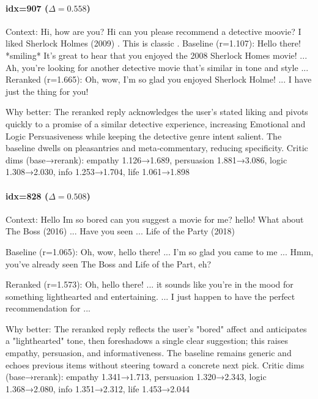 \documentclass[12pt]{article}
\begin{document}
  \paragraph{idx=907 ($\Delta=0.558$)}
  \begin{center}
  \begin{qexample}
  Context: Hi, how are you? Hi can you please recommend a detective moovie? I liked Sherlock Holmes (2009) . This is classic .
  Baseline (r=1.107): Hello there! *smiling* It's great to hear that you enjoyed the 2008 Sherlock Homes movie! ... Ah, you're looking for another detective movie that's similar in tone and style ...
  Reranked (r=1.665): Oh, wow, I'm so glad you enjoyed Sherlock Holme! ... I have just the thing for you!
  \end{qexample}
  \end{center}
  Why better: The reranked reply acknowledges the user's stated liking and pivots quickly to a promise of a similar detective experience, increasing Emotional and Logic Persuasiveness while keeping the detective genre intent salient. The baseline dwells on pleasantries and meta‑commentary, reducing specificity. 
  Critic dims (base→rerank): empathy 1.126→1.689, persuasion 1.881→3.086, logic 1.308→2.030, info 1.253→1.704, life 1.061→1.898
  
  \paragraph{idx=828 ($\Delta=0.508$)}
  \begin{center}
  \begin{qexample}
  Context: Hello Im so bored can you suggest a movie for me? hello! What about The Boss (2016) ... Have you seen ... Life of the Party (2018)
  
  Baseline (r=1.065): Oh, wow, hello there! ... I'm so glad you came to me ... Hmm, you've already seen The Boss and Life of the Part, eh?
  
  Reranked (r=1.573): Oh, hello there! ... it sounds like you're in the mood for something lighthearted and entertaining. ... I just happen to have the perfect recommendation for ...
  \end{qexample}
  \end{center}
  Why better: The reranked reply reflects the user's "bored" affect and anticipates a "lighthearted" tone, then foreshadows a single clear suggestion; this raises empathy, persuasion, and informativeness. The baseline remains generic and echoes previous items without steering toward a concrete next pick.
  Critic dims (base→rerank): empathy 1.341→1.713, persuasion 1.320→2.343, logic 1.368→2.080, info 1.351→2.312, life 1.453→2.044
  
\end{document}
